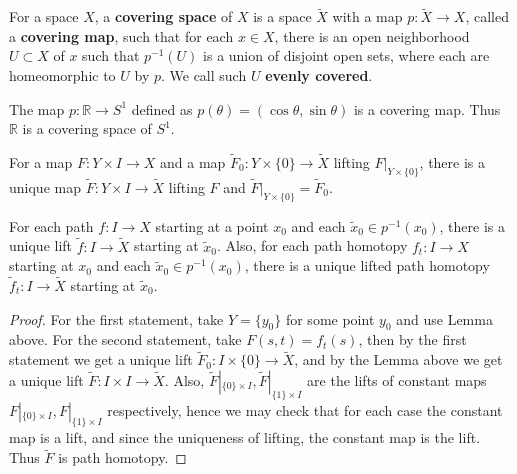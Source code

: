 \begin{defn} For a space $X$, a \textbf{covering space} of $X$ is a space $\tilde{X}$ with a map $p:\tilde{X}\rightarrow X$, called a \textbf{covering map}, such that for each $x\in X$, there is an open neighborhood $U\subset X$ of $x$ such that $p^{-1}(U)$ is a union of disjoint open sets, where each are homeomorphic to $U$ by $p$. We call such $U$ \textbf{evenly covered}.
\end{defn}

\begin{exmp} The map $p:\mathbb{R}\rightarrow S^1$ defined as $p(\theta)=(\cos\theta,\sin\theta)$ is a covering map. Thus $\mathbb{R}$ is a covering space of $S^1$.
\end{exmp}

\begin{lemma} For a map $F:Y\times I\rightarrow X$ and a map $\tilde{F}_0:Y\times\{0\}\rightarrow \tilde{X}$ lifting $F|_{Y\times \{0\}}$, there is a unique map $\tilde{F}:Y\times I\rightarrow \tilde{X}$ lifting $F$ and $\tilde{F}|_{Y\times \{0\}}=\tilde{F}_0$.
\end{lemma}
\begin{lemma} For each path $f:I\rightarrow X$ starting at a point $x_0$ and each $\tilde{x}_0\in p^{-1}(x_0)$, there is a unique lift $\tilde{f}:I\rightarrow \tilde{X}$ starting at $\tilde{x}_0$. Also, for each path homotopy $f_t:I\rightarrow X$ starting at $x_0$ and each $\tilde{x}_0\in p^{-1}(x_0)$, there is a unique lifted path homotopy $\tilde{f}_t:I\rightarrow \tilde{X}$ starting at $\tilde{x}_0$.
\end{lemma}
\begin{proof}
For the first statement, take $Y=\{y_0\}$ for some point $y_0$ and use Lemma above. For the second statement, take $F(s,t)=f_t(s)$, then by the first statement we get a unique lift $\tilde{F}_0:I\times \{0\}\rightarrow \tilde{X}$, and by the Lemma above we get a unique lift $\tilde{F}:I\times I\rightarrow \tilde{X}$. Also, $\tilde{F}|_{\{0\}\times I},\tilde{F}|_{\{1\}\times I}$ are the lifts of constant maps $F|_{\{0\}\times I},F|_{\{1\}\times I}$ respectively, hence we may check that for each case the constant map is a lift, and since the uniqueness of lifting, the constant map is the lift. Thus $\tilde{F}$ is path homotopy.
\end{proof}

